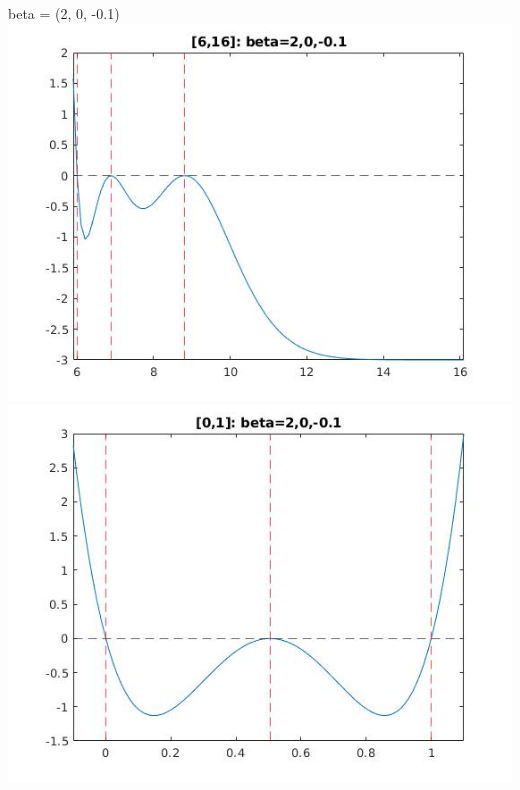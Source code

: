 \documentclass[11pt]{beamer}
\begin{document}
\begin{frame}{beta = (2, 0, -0.1)}
\includegraphics[scale=0.18]{quadplots/616_1.jpg}
\includegraphics[scale=0.18]{quadplots/01_1.jpg}

\end{frame}
\end{document}
